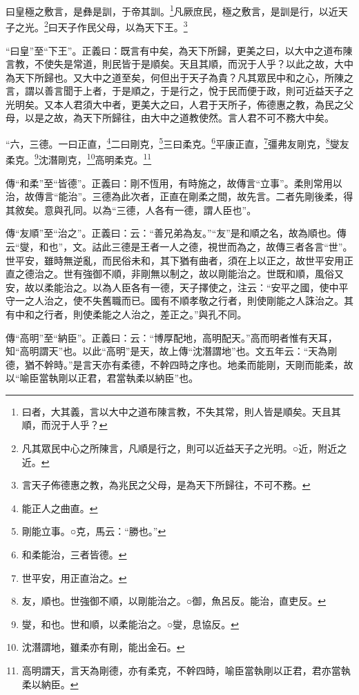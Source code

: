 曰皇極之敷言，是彝是訓，于帝其訓。\footnote{曰者，大其義，言以大中之道布陳言教，不失其常，則人皆是順矣。天且其順，而況于人乎？}凡厥庶民，極之敷言，是訓是行，以近天子之光。\footnote{凡其眾民中心之所陳言，凡順是行之，則可以近益天子之光明。○近，附近之近。}曰天子作民父母，以為天下王。\footnote{言天子佈德惠之教，為兆民之父母，是為天下所歸往，不可不務。}

{\noindent\shu{}\fzkt “曰皇”至“下王”。正義曰：既言有中矣，為天下所歸，更美之曰，以大中之道布陳言教，不使失是常道，則民皆于是順矣。天且其順，而況于人乎？以此之故，大中為天下所歸也。又大中之道至矣，何但出于天子為貴？凡其眾民中和之心，所陳之言，謂以善言聞于上者，于是順之，于是行之，悅于民而便于政，則可近益天子之光明矣。又本人君須大中者，更美大之曰，人君于天所子，佈德惠之教，為民之父母，以是之故，為天下所歸往，由大中之道教使然。言人君不可不務大中矣。 \par}

“六，三德。一曰正直，\footnote{能正人之曲直。}二曰剛克，\footnote{剛能立事。○克，馬云：“勝也。”}三曰柔克。\footnote{和柔能治，三者皆德。}平康正直，\footnote{世平安，用正直治之。}彊弗友剛克，\footnote{友，順也。世強御不順，以剛能治之。○御，魚呂反。能治，直吏反。}燮友柔克。\footnote{燮，和也。世和順，以柔能治之。○燮，息協反。}沈潛剛克，\footnote{沈潛謂地，雖柔亦有剛，能出金石。}高明柔克。\footnote{高明謂天，言天為剛德，亦有柔克，不幹四時，喻臣當執剛以正君，君亦當執柔以納臣。}


{\noindent\zhuan{}\fzbyks 傳“和柔”至“皆德”。正義曰：剛不恆用，有時施之，故傳言“立事”。柔則常用以治，故傳言“能治”。三德為此次者，正直在剛柔之間，故先言。二者先剛後柔，得其敘矣。意與孔同。以為“三德，人各有一德，謂人臣也”。 \par}

{\noindent\zhuan{}\fzbyks 傳“友順”至“治之”。正義曰：云：“善兄弟為友。”“友”是和順之名，故為順也。傳云“燮，和也”，文。詁此三德是王者一人之德，視世而為之，故傳三者各言“世”。世平安，雖時無逆亂，而民俗未和，其下猶有曲者，須在上以正之，故世平安用正直之德治之。世有強御不順，非剛無以制之，故以剛能治之。世既和順，風俗又安，故以柔能治之。以為人臣各有一德，天子擇使之，注云：“安平之國，使中平守一之人治之，使不失舊職而已。國有不順孝敬之行者，則使剛能之人誅治之。其有中和之行者，則使柔能之人治之，差正之。”與孔不同。 \par}

{\noindent\zhuan{}\fzbyks 傳“高明”至“納臣”。正義曰：云：“博厚配地，高明配天。”高而明者惟有天耳，知“高明謂天”也。以此“高明”是天，故上傳“沈潛謂地”也。文五年云：“天為剛德，猶不幹時。”是言天亦有柔德，不幹四時之序也。地柔而能剛，天剛而能柔，故以“喻臣當執剛以正君，君當執柔以納臣”也。 \par}

